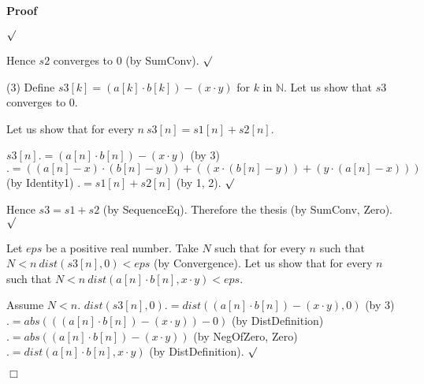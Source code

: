 \documentclass{article}
\newenvironment{forthel}{\begin{leftbar}}{\end{leftbar}}
\newenvironment{proof}{\noindent\textbf{Proof\ }}{\hspace*{\fill}$\Box$\medskip}
\newenvironment{subproof}{\begin{list}{}{}
		\item[\text{Proof}]}{\hfill $\surd$ \end{list}}
\newcommand{\NN}{\mathbb{N}}
\newcommand{\plusone}{+}
\begin{document}
\begin{forthel}
\begin{proof}
\begin{subproof}
\begin{subproof}
	\end{subproof}
	Hence $s2$ converges to $0$ (by SumConv).
	\end{subproof}
	(3) Define $s3[k] = (a[k] \cdot b[k]) - (x \cdot y)$ for $k$ in $\NN$.
	Let us show that $s3$ converges to $0$.
	\begin{subproof}
	Let us show that for every $n \ s3[n] = s1[n] + s2[n]$.
	\begin{subproof}
	$s3[n] .= (a[n] \cdot b[n]) - (x \cdot y)$ (by 3)
	$.= ((a[n] - x) \cdot (b[n] - y)) + ((x \cdot (b[n] - y)) + (y \cdot (a[n] - x)))$ (by Identity1)
	$.= s1[n] + s2[n]$ (by 1, 2).
	\end{subproof}
	Hence $s3 = s1 \plusone s2$ (by SequenceEq).
	Therefore the thesis (by SumConv, Zero).
	\end{subproof}
	Let $eps$ be a positive real number.
	Take $N$ such that for every $n$ such that $N < n \ dist(s3[n],0) < eps$ (by Convergence).
	Let us show that for every $n$ such that $N < n \ dist(a[n] \cdot b[n],x \cdot y) < eps$.
	\begin{subproof}
	Assume $N < n$.
	$dist(s3[n],0) .= dist((a[n] \cdot b[n]) - (x \cdot y),0)$ (by 3)
	$.= abs(((a[n] \cdot b[n]) - (x \cdot y)) - 0)$ (by DistDefinition)
	$.= abs((a[n] \cdot b[n]) - (x \cdot y))$ (by NegOfZero, Zero)
	$.= dist(a[n] \cdot b[n],x \cdot y)$ (by DistDefinition).
	\end{subproof}
	\end{proof}


\end{forthel}
\end{document}
